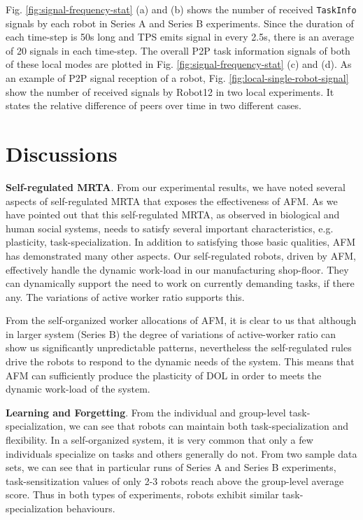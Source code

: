 \documentclass[final,5p,times,twocolumn]{elsarticle}
\begin{document}
Fig. \ref{fig:signal-frequency-stat} (a) and (b) shows the number of received \texttt{TaskInfo} signals by each robot in Series A and Series B experiments. Since the duration of each time-step is 50s long and TPS emits signal in every 2.5s, there is an average of 20 signals in each time-step. The overall P2P task information signals of both of these local modes are plotted in Fig. \ref{fig:signal-frequency-stat} (c) and (d). As an example of P2P signal reception of a robot,  Fig. \ref{fig:local-single-robot-signal} show the number of received signals by Robot12 in two local experiments. It states the relative difference of peers over time in two different cases.
\section{Discussions}
\label{sec:discuss}
\textbf{Self-regulated MRTA}. From our experimental results, we have noted several aspects of self-regulated MRTA that exposes the effectiveness of AFM. As we have pointed out that this self-regulated MRTA, as observed in biological and human social systems, needs to satisfy several important characteristics, e.g. plasticity, task-specialization. In addition to satisfying those basic qualities, AFM has demonstrated many other aspects. Our self-regulated robots, driven by AFM, effectively handle the dynamic work-load in our manufacturing shop-floor. They can dynamically support the need to work on currently demanding tasks, if there any. The variations of active worker ratio supports this. 

From the self-organized worker allocations of AFM, it is clear to us that although in larger system (Series B) the degree of variations of active-worker ratio can show us significantly unpredictable patterns, nevertheless the self-regulated rules drive the robots to respond to the dynamic needs of the system. This means that AFM can sufficiently produce the plasticity of DOL in order to meets the dynamic work-load of the system.

\textbf{Learning and Forgetting}. From the individual and group-level task-specialization, we can see that robots can maintain both task-specialization and flexibility. In a self-organized system, it is very common that only a few individuals specialize on tasks and others generally do not. From two sample data sets, we can see that in particular runs of Series A and Series B experiments, task-sensitization values of  only 2-3 robots reach above the group-level average score. Thus in both types of experiments, robots exhibit similar task-specialization behaviours. 
\end{document}

